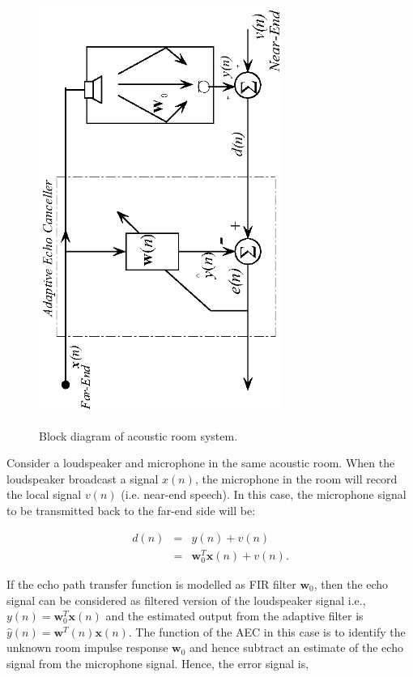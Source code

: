 \begin{figure}[!htb]
  \centering
  \includegraphics[width=8cm, angle=-90]{Figures/Chapter1/fig2path1.eps}\\
  \caption{Block diagram of acoustic room system.}
  \label{fig8x}
\end{figure}


\par
\vspace{-0.3cm}
\noindent Consider a loudspeaker and microphone in the same acoustic room. When the loudspeaker broadcast a signal $x(n)$, the microphone in the room will record the local signal $v(n)$ (i.e. near-end speech). In this case, the microphone signal to be transmitted back to the far-end side will be:

\vspace{-1.5cm}
\begin{eqnarray}
\nonumber
d(n)&=&y(n)+v(n)\\
&=&\textbf{w}_0^{T} \textbf{x}(n)+v(n).\label{eq1a}
\end{eqnarray}

\vspace{-0.6cm}
\par
\noindent If the echo path transfer function is modelled as FIR filter $\textbf{w}_{0}$, then the echo signal can be considered as filtered
 version of the loudspeaker signal i.e., $y(n)=\textbf{w}_{0}^T\textbf{x}(n)$ and the estimated output from the adaptive filter
 is $\hat{y}(n)=\textbf{w}^{T}(n)\textbf{x}(n)$. The function of the AEC in this case is to identify the unknown room impulse response $\textbf{w}_{0}$ and hence subtract an estimate of the echo signal from the microphone signal. Hence, the error signal is,

